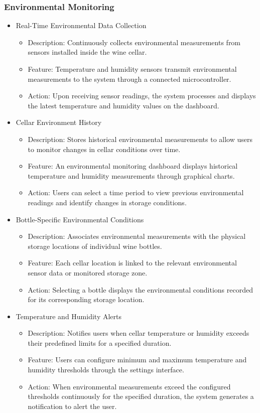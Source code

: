 \documentclass[conference]{IEEEtran}
\begin{document}
\subsubsection{Environmental Monitoring}
\begin{itemize}
    \item Real-Time Environmental Data Collection
    \begin{itemize}
        \item Description: Continuously collects environmental measurements from sensors installed inside the wine cellar.
        \item Feature: Temperature and humidity sensors transmit environmental measurements to the system through a connected microcontroller.
        \item Action: Upon receiving sensor readings, the system processes and displays the latest temperature and humidity values on the dashboard.
    \end{itemize}

    \item Cellar Environment History
    \begin{itemize}
        \item Description: Stores historical environmental measurements to allow users to monitor changes in cellar conditions over time.
        \item Feature: An environmental monitoring dashboard displays historical temperature and humidity measurements through graphical charts.
        \item Action: Users can select a time period to view previous environmental readings and identify changes in storage conditions.
    \end{itemize}

    \item Bottle-Specific Environmental Conditions
    \begin{itemize}
        \item Description: Associates environmental measurements with the physical storage locations of individual wine bottles.
        \item Feature: Each cellar location is linked to the relevant environmental sensor data or monitored storage zone.
        \item Action: Selecting a bottle displays the environmental conditions recorded for its corresponding storage location.
    \end{itemize}

    \item Temperature and Humidity Alerts
    \begin{itemize}
        \item Description: Notifies users when cellar temperature or humidity exceeds their predefined limits for a specified duration.
        \item Feature: Users can configure minimum and maximum temperature and humidity thresholds through the settings interface.
        \item Action: When environmental measurements exceed the configured thresholds continuously for the specified duration, the system generates a notification to alert the user.
    \end{itemize}


\end{itemize}
\end{document}
